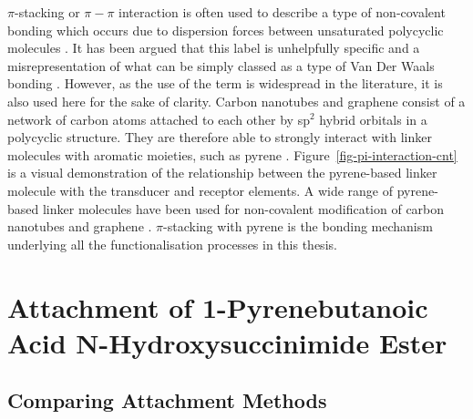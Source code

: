 \documentclass[
  a4paper,
]{scrbook}
\begin{document}
\(\pi\)-stacking or \(\pi-\pi\) interaction is often used to describe a
type of non-covalent bonding which occurs due to dispersion forces
between unsaturated polycyclic molecules \autocite{Perez2015}. It has
been argued that this label is unhelpfully specific and a
misrepresentation of what can be simply classed as a type of Van Der
Waals bonding \autocite{Martinez2012,Perez2015}. However, as the use of
the term is widespread in the literature, it is also used here for the
sake of clarity. Carbon nanotubes and graphene consist of a network of
carbon atoms attached to each other by sp\(^{2}\) hybrid orbitals in a
polycyclic structure. They are therefore able to strongly interact with
linker molecules with aromatic moieties, such as pyrene
\autocite{Hermanson2013-16,Perez2015,Mishyn2022}.
Figure~\ref{fig-pi-interaction-cnt} is a visual demonstration of the
relationship between the pyrene-based linker molecule with the
transducer and receptor elements. A wide range of pyrene-based linker
molecules have been used for non-covalent modification of carbon
nanotubes and graphene \autocite{Zhou2019}. \(\pi\)-stacking with pyrene
is the bonding mechanism underlying all the functionalisation processes
in this thesis.

\hypertarget{sec-PBASE}{%
\section{Attachment of 1-Pyrenebutanoic Acid N-Hydroxysuccinimide
Ester}\label{sec-PBASE}}

\hypertarget{sec-PBASE-attachment}{%
\subsection{Comparing Attachment Methods}\label{sec-PBASE-attachment}}
\end{document}
